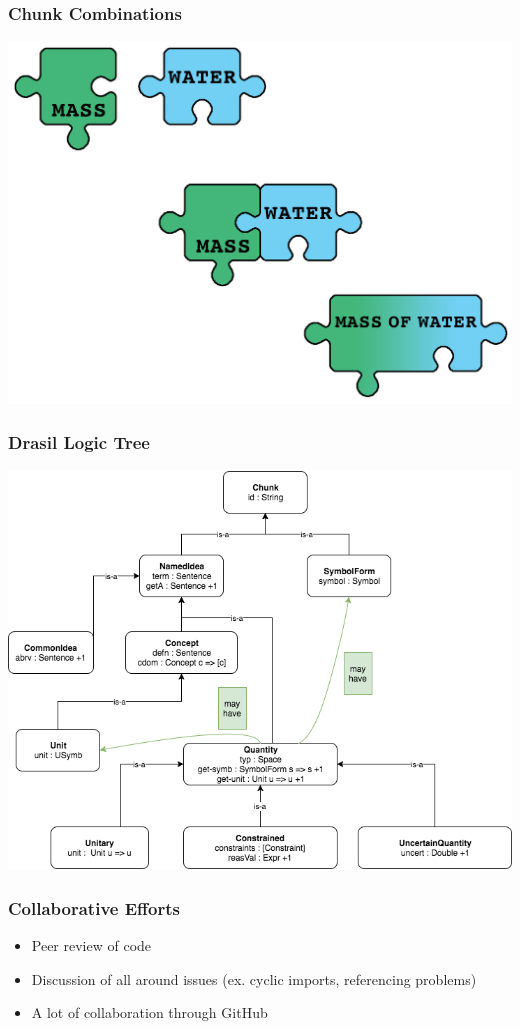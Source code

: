 \documentclass{beamer}
\begin{document}
\begin{frame}
\frametitle{Chunk Combinations}
\includegraphics[scale=0.19]{Puzzle.png}
\end{frame}

\begin{frame}
\frametitle{Drasil Logic Tree}
\centering
\includegraphics[scale=0.38]{../WG2_11/class_hierarchy.png}

\end{frame}

\begin{frame}
\frametitle{Collaborative Efforts}
\begin{itemize}
 \item<1-> Peer review of code\linebreak
 \item<2-> Discussion of all around issues (ex. cyclic imports, referencing problems)\linebreak
 \item<3-> A lot of collaboration through GitHub\linebreak
\end{itemize}
\end{frame}
\end{document}
